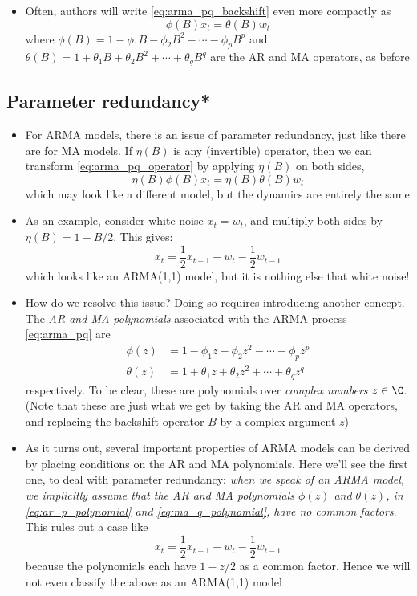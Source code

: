 \documentclass{article}
\begin{document}
\begin{itemize}
\item Often, authors will write \eqref{eq:arma_pq_backshift} even more compactly
  as    
  \begin{equation}
  \label{eq:arma_pq_operator}
  \phi(B) x_t = \theta(B) w_t  
  \end{equation}
  where $\phi(B) = 1 - \phi_1 B - \phi_2 B^2 - \cdots - \phi_p B^p$ and
  $\theta(B) = 1 + \theta_1 B + \theta_2 B^2 + \cdots + \theta_q B^q$ are the AR 
  and MA operators, as before 
\end{itemize}

\subsection{Parameter redundancy*}

\begin{itemize}
\item For ARMA models, there is an issue of parameter redundancy, just like
  there are for MA models. If $\eta(B)$ is any (invertible) operator, then we
  can transform \eqref{eq:arma_pq_operator} by applying $\eta(B)$ on both sides,  
  \[
  \eta(B) \phi(B) x_t = \eta(B) \theta(B) w_t  
  \]
  which may look like a different model, but the dynamics are entirely the
  same  

\item As an example, consider white noise $x_t = w_t$, and multiply both sides
  by $\eta(B) = 1 - B/2$. This gives:
  \[
  x_t = \frac{1}{2} x_{t-1} + w_t - \frac{1}{2} w_{t-1}
  \]
  which looks like an ARMA(1,1) model, but it is nothing else that white noise!
 
\item How do we resolve this issue? Doing so requires introducing another
  concept. The \emph{AR and MA polynomials} associated with the ARMA process
  \eqref{eq:arma_pq} are 
  \begin{align}
  \label{eq:ar_p_polynomial}
  \phi(z) &= 1 - \phi_1 z - \phi_2 z^2 - \cdots - \phi_p z^p \\
  \label{eq:ma_q_polynomial}
  \theta(z) &= 1 + \theta_1 z + \theta_2 z^2 + \cdots + \theta_q z^q
  \end{align}
  respectively. To be clear, these are polynomials over \emph{complex numbers}
  $z \in \C$. (Note that these are just what we get by taking the AR and MA
  operators, and replacing the backshift operator $B$ by a complex argument $z$) 

\item As it turns out, several important properties of ARMA models can be 
  derived by placing conditions on the AR and MA polynomials. Here we'll see the
  first one, to deal with parameter redundancy: \emph{when we speak of an ARMA
    model, we implicitly assume that the AR and MA polynomials $\phi(z)$ and
    $\theta(z)$, in \eqref{eq:ar_p_polynomial} and \eqref{eq:ma_q_polynomial},
    have no common factors}. This rules out a case like   
  \[
  x_t = \frac{1}{2} x_{t-1} + w_t - \frac{1}{2} w_{t-1}
  \]
  because the polynomials each have $1-z/2$ as a common factor. Hence we will
  not even classify the above as an ARMA(1,1) model
\end{itemize}
\end{document}
